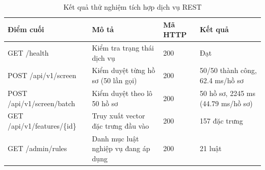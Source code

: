 \begin{table}[!htbp]
\centering
\caption{Kết quả thử nghiệm tích hợp dịch vụ REST}
\label{tab:api}
\small
\setlength{\tabcolsep}{5.0pt}
\begin{tabular}{@{}L{4.600cm}L{4.161cm}R{1.702cm}L{3.783cm}@{}}
\toprule
\textbf{Điểm cuối} & \textbf{Mô tả} & \textbf{Mã HTTP} & \textbf{Kết quả} \\
\midrule
GET /health & Kiểm tra trạng thái dịch vụ & 200 & Đạt \\
POST /api/v1/screen & Kiểm duyệt từng hồ sơ (50 lần gọi) & 200 & 50/50 thành công, 62.4 ms/hồ sơ \\
POST /api/v1/screen/batch & Kiểm duyệt theo lô 50 hồ sơ & 200 & 50 hồ sơ, 2245 ms (44.79 ms/hồ sơ) \\
GET /api/v1/features/\{id\} & Truy xuất vector đặc trưng đầu vào & 200 & 157 đặc trưng \\
GET /admin/rules & Danh mục luật nghiệp vụ đang áp dụng & 200 & 21 luật \\
\bottomrule
\end{tabular}
\end{table}
